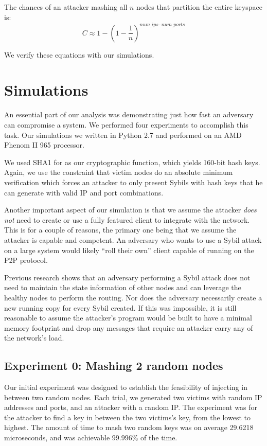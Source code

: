\documentclass[11pt,conference]{IEEEtran}
\begin{document}
The chances of an attacker mashing all $n$ nodes that partition the entire keyspace is:
$$C \approx  1 - (1 -\frac{1}{n})^{num\_ips \cdot num\_ports}  $$

We verify these equations with our simulations.

\section{Simulations}
\label{sec:experiments}
An essential part of our analysis was demonstrating just how fast an adversary can compromise a system.
We performed four experiments to accomplish this task.
Our simulations we written in Python 2.7 and performed on an AMD Phenom II 965 processor. %


We used SHA1 for as our cryptographic function, which yields 160-bit hash keys.
Again, we use the constraint that victim nodes do an absolute minimum verification which forces an attacker to only present Sybils with hash keys that he can generate with valid IP and port combinations.

Another important aspect of our simulation is that we assume the attacker \textit{does not }need to create or use a fully featured client to integrate with the network.
This is for a couple of reasons, the primary one being that we assume the attacker is capable and competent.
An adversary who wants to use a Sybil attack on a large system would likely ``roll their own'' client capable of running on the P2P protocol.

Previous research \cite{sybilbit} shows that an adversary performing a Sybil attack does not need to maintain the state information of other nodes and can leverage the healthy nodes to perform the routing.
Nor does the adversary necessarily create a new running copy for every Sybil created. 
If this was impossible, it is still reasonable to assume the attacker's program would be built to have a minimal memory footprint and drop any messages that require an attacker carry any of the network's load.








\subsection{Experiment 0: Mashing 2 random nodes}
Our initial experiment was designed to establish the feasibility of injecting in between two random nodes.
Each trial, we generated two victims with random IP addresses and ports, and an attacker with a random IP.
The experiment was for the attacker to find a key in between the two victims's key, from the lowest to highest.
The amount of time to mash two random keys was on average 29.6218 microseconds, and was achievable $ 99.996\%$ of the time.
\end{document}
